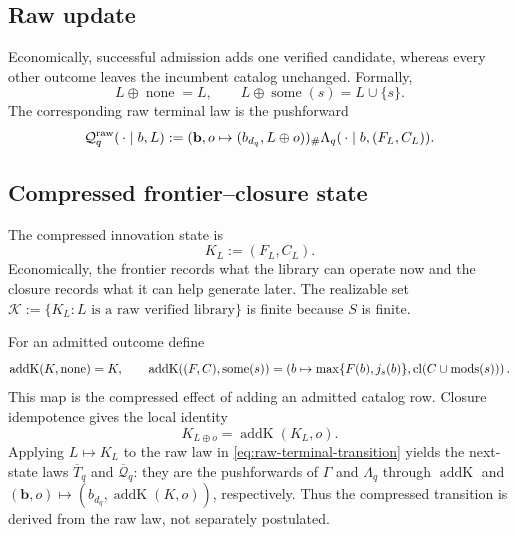 \subsection{Raw update}

Economically, successful admission adds one verified candidate, whereas every
other outcome leaves the incumbent catalog unchanged.  Formally,
\begin{equation}\label{eq:raw-library-update}
  L\oplus\operatorname{none}=L,
  \qquad
  L\oplus\operatorname{some}(s)=L\cup\{s\}.
\end{equation}
The corresponding raw terminal law is the pushforward
\begin{equation}\label{eq:raw-terminal-transition}
  \mathcal Q_q^{\rm raw}(\,\cdot\mid b,L)
  :=(\mathbf b,o\mapsto(b_{d_q},L\oplus o))_{\#}
    \Lambda_q(\,\cdot\mid b,(F_L,C_L)).
\end{equation}

\subsection{Compressed frontier--closure state}

\begin{definition}
\label{def:finite-library-state}
The compressed innovation state is
\begin{equation}\label{eq:closure-compression}
  K_L:=(F_L,C_L).
\end{equation}
Economically, the frontier records what the library can operate now and the
closure records what it can help generate later.  The realizable set
\(\mathcal K:=\{K_L:L\text{ is a raw verified library}\}\) is finite because
\(S\) is finite.
\end{definition}

For an admitted outcome define
\[
  \operatorname{addK}(K,\operatorname{none})=K,
  \qquad
  \operatorname{addK}((F,C),\operatorname{some}(s))
  =\left(b\mapsto\max\{F(b),j_s(b)\},
    \operatorname{cl}(C\cup\operatorname{mods}(s))\right).
\]
This map is the compressed effect of adding an admitted catalog row.  Closure
idempotence gives the local identity
\begin{equation}\label{eq:raw-compressed-local-update}
  K_{L\oplus o}=\operatorname{addK}(K_L,o).
\end{equation}
Applying \(L\mapsto K_L\) to the raw law in
\cref{eq:raw-terminal-transition} yields the next-state laws
\(\overline T_q\) and \(\overline{\mathcal Q}_q\): they are the pushforwards of
\(\Gamma\) and \(\Lambda_q\) through \(\operatorname{addK}\) and
\((\mathbf b,o)\mapsto(b_{d_q},\operatorname{addK}(K,o))\), respectively.
Thus the compressed transition is derived from the raw law, not separately
postulated.

